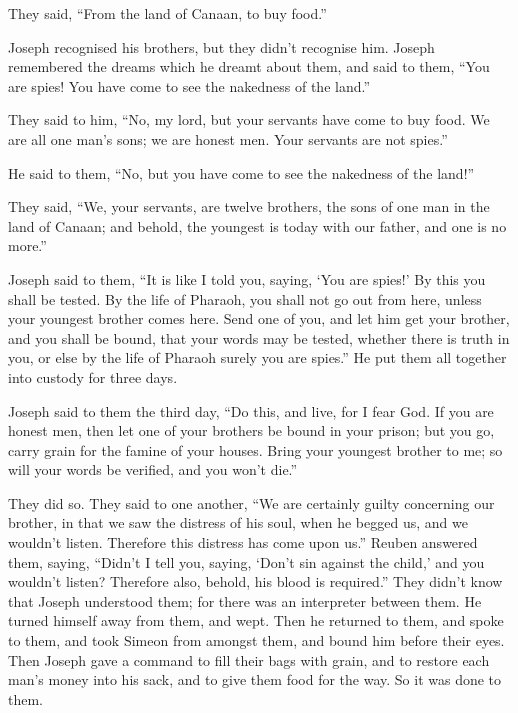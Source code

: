 They said, ``From the land of Canaan, to buy food.''

 Joseph recognised his brothers, but they didn't recognise
him.  Joseph remembered the dreams which he dreamt about
them, and said to them, ``You are spies! You have come to see the
nakedness of the land.''

 They said to him, ``No, my lord, but your servants have
come to buy food.  We are all one man's sons; we are
honest men. Your servants are not spies.''

 He said to them, ``No, but you have come to see the
nakedness of the land!''

 They said, ``We, your servants, are twelve brothers, the
sons of one man in the land of Canaan; and behold, the youngest is today
with our father, and one is no more.''

 Joseph said to them, ``It is like I told you, saying,
`You are spies!'  By this you shall be tested. By the
life of Pharaoh, you shall not go out from here, unless your youngest
brother comes here.  Send one of you, and let him get
your brother, and you shall be bound, that your words may be tested,
whether there is truth in you, or else by the life of Pharaoh surely you
are spies.''  He put them all together into custody for
three days.

 Joseph said to them the third day, ``Do this, and live,
for I fear God.  If you are honest men, then let one of
your brothers be bound in your prison; but you go, carry grain for the
famine of your houses.  Bring your youngest brother to
me; so will your words be verified, and you won't die.''

They did so.  They said to one another, ``We are
certainly guilty concerning our brother, in that we saw the distress of
his soul, when he begged us, and we wouldn't listen. Therefore this
distress has come upon us.''  Reuben answered them,
saying, ``Didn't I tell you, saying, `Don't sin against the child,' and
you wouldn't listen? Therefore also, behold, his blood is required.''
 They didn't know that Joseph understood them; for there
was an interpreter between them.  He turned himself away
from them, and wept. Then he returned to them, and spoke to them, and
took Simeon from amongst them, and bound him before their eyes.
 Then Joseph gave a command to fill their bags with
grain, and to restore each man's money into his sack, and to give them
food for the way. So it was done to them.

